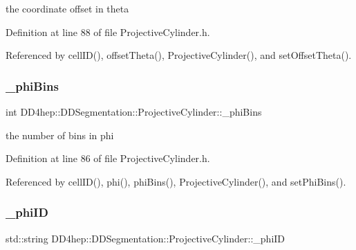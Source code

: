 the coordinate offset in theta 



Definition at line 88 of file Projective\+Cylinder.\+h.



Referenced by cell\+I\+D(), offset\+Theta(), Projective\+Cylinder(), and set\+Offset\+Theta().

\hypertarget{class_d_d4hep_1_1_d_d_segmentation_1_1_projective_cylinder_a80805ac35e9e3580d0d4e8dd0285ca4e}{}\label{class_d_d4hep_1_1_d_d_segmentation_1_1_projective_cylinder_a80805ac35e9e3580d0d4e8dd0285ca4e} 
\subsubsection{\texorpdfstring{\+\_\+phi\+Bins}{\_phiBins}}
{\footnotesize\ttfamily int D\+D4hep\+::\+D\+D\+Segmentation\+::\+Projective\+Cylinder\+::\+\_\+phi\+Bins\hspace{0.3cm}{\ttfamily [protected]}}



the number of bins in phi 



Definition at line 86 of file Projective\+Cylinder.\+h.



Referenced by cell\+I\+D(), phi(), phi\+Bins(), Projective\+Cylinder(), and set\+Phi\+Bins().

\hypertarget{class_d_d4hep_1_1_d_d_segmentation_1_1_projective_cylinder_a371344e0fee63cfe8e6c58cf9132fde2}{}\label{class_d_d4hep_1_1_d_d_segmentation_1_1_projective_cylinder_a371344e0fee63cfe8e6c58cf9132fde2} 
\subsubsection{\texorpdfstring{\+\_\+phi\+ID}{\_phiID}}
{\footnotesize\ttfamily std\+::string D\+D4hep\+::\+D\+D\+Segmentation\+::\+Projective\+Cylinder\+::\+\_\+phi\+ID\hspace{0.3cm}{\ttfamily [protected]}}



